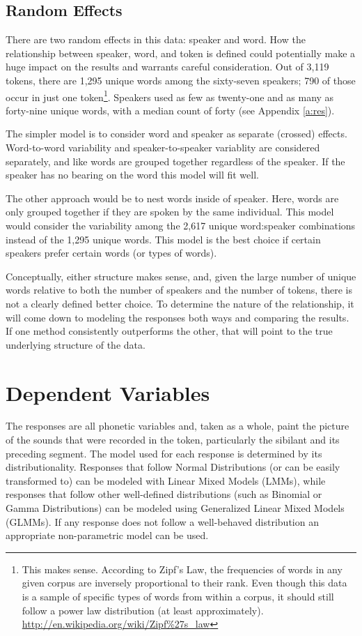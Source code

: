 \documentclass[a4paper]{article}
\begin{document}
\newpage
\subsection*{Random Effects}
There are two random effects in this data: speaker and word.  How the
relationship between speaker, word, and token is defined could
potentially make a huge impact on the results and warrants careful
consideration. Out of 3,119 tokens, there are 1,295 unique words among
the sixty-seven speakers; 790 of those occur in just one token\footnote{
  This makes sense.  According to Zipf's Law, the frequencies of words
  in any given corpus are inversely proportional to their rank.  Even
  though this data is a sample of specific types of words from within
  a corpus, it should still follow a power law distribution (at least approximately).\\
  \url{http://en.wikipedia.org/wiki/Zipf\%27s_law}
}.  Speakers used as few as twenty-one and as many as forty-nine
unique words, with a median count of forty (see Appendix \ref{a:res}).

The simpler model is to consider word and speaker as separate
(crossed) effects.  Word-to-word variability and
speaker-to-speaker variablity are considered separately, and like
words are grouped together regardless of the speaker.  If the speaker
has no bearing on the word this model will fit well.

The other approach would be to nest words inside of speaker.  Here,
words are only grouped together if they are spoken by the same
individual. This
model would consider the variability among the 2,617 unique
word:speaker combinations instead of the 1,295 unique words.  This
model is the best choice if certain speakers prefer certain words (or
types of words).

Conceptually, either structure makes sense, and, given the large number
of unique words relative to both the number of speakers and the number
of tokens, there is not a clearly defined better choice.  To determine
the nature of the relationship, it will come down to modeling the
responses both ways and comparing the results.  If one method consistently
outperforms the other, that will point to the true underlying
structure of the data.



\section*{Dependent Variables}
The responses are all phonetic variables and, taken as a whole, paint
the picture of the sounds that were recorded in the token,
particularly the sibilant and its preceding segment.
The model used for each response is determined
by its distributionality.  Responses that follow Normal Distributions
(or can be easily transformed to) can be modeled with Linear Mixed
Models (LMMs), while responses that follow other well-defined
distributions (such as Binomial or Gamma Distributions) can be modeled
using Generalized Linear Mixed Models (GLMMs).  If any response does
not follow a well-behaved distribution an appropriate non-parametric
model can be used.
\end{document}
